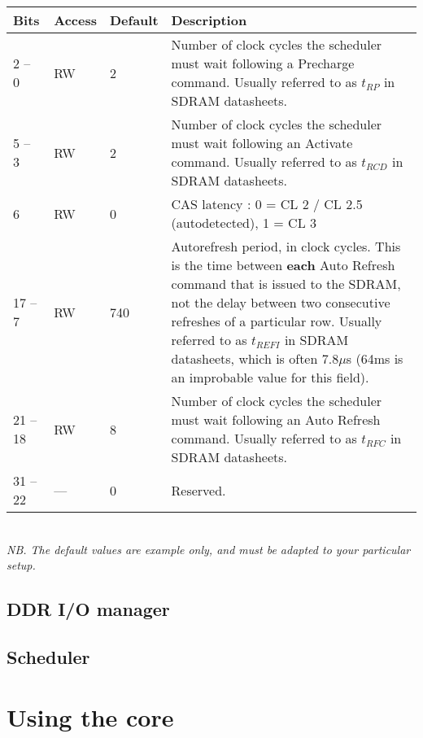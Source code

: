 \documentclass[a4paper,11pt]{article}
\begin{document}
\begin{tabular}{|p{1.5cm}|l|l|p{10cm}|}
\hline
\bf Bits & \bf Access & \bf Default & \bf Description \\
\hline
2 -- 0 & RW & 2 & Number of clock cycles the scheduler must wait following a Precharge command. Usually referred to as $t_{RP}$ in SDRAM datasheets. \\
\hline
5 -- 3 & RW & 2 & Number of clock cycles the scheduler must wait following an Activate command. Usually referred to as $t_{RCD}$ in SDRAM datasheets. \\
\hline
6 & RW & 0 & CAS latency : 0 = CL 2 / CL 2.5 (autodetected), 1 = CL 3 \\
\hline
17 -- 7 & RW & 740 & Autorefresh period, in clock cycles. This is the time between \textbf{each} Auto Refresh command that is issued to the SDRAM, not the delay between two consecutive refreshes of a particular row. Usually referred to as $t_{REFI}$ in SDRAM datasheets, which is often  7.8$\mu$s  (64ms is an improbable value for this field). \\
\hline
21 -- 18 & RW & 8 & Number of clock cycles the scheduler must wait following an Auto Refresh command. Usually referred to as $t_{RFC}$ in SDRAM datasheets. \\
\hline
31 -- 22 & --- & 0 & Reserved. \\
\hline
\end{tabular}\\

\textit{NB. The default values are example only, and must be adapted to your particular setup.}


\subsection{DDR I/O manager}

\subsection{Scheduler}

\section{Using the core}
\end{document}
